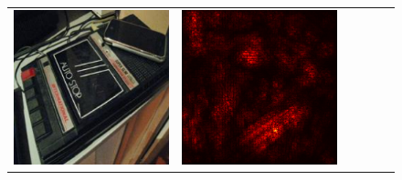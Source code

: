 \documentclass[preprint,12pt]{elsarticle}
\begin{document}
\begin{figure}[p]
\begin{tabular}{cccccc}
  \includegraphics[scale=\scale]{../visualizations/examples/imagenette/cnn/images/2.png} &
  \includegraphics[scale=\scale]{../visualizations/examples/imagenette/cnn/saliency_map/2.png} & 

\end{tabular}
\end{figure}
\end{document}
